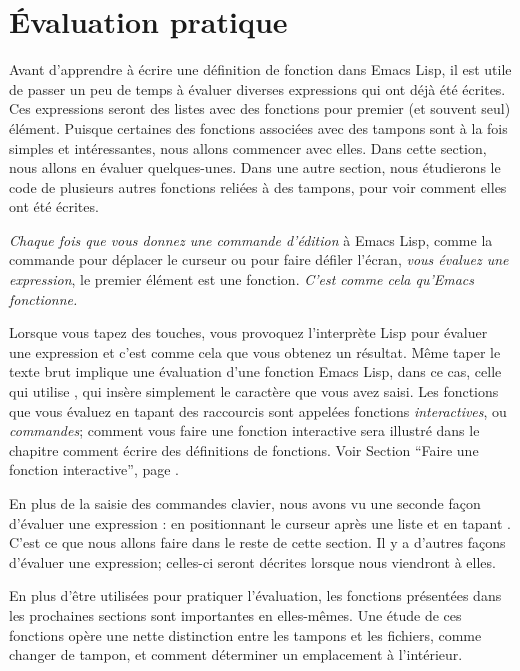 \chapter{\'Evaluation pratique}

Avant d'apprendre à écrire une définition de fonction dans Emacs Lisp,
il est utile de passer un peu de temps à évaluer diverses expressions
qui ont déjà été écrites. Ces expressions seront des listes avec des
fonctions pour premier (et souvent seul) élément. Puisque certaines des
fonctions associées avec des tampons sont à la fois simples et
intéressantes, nous allons commencer avec elles. Dans cette section,
nous allons en évaluer quelques-unes. Dans une autre section, nous
étudierons le code de plusieurs autres fonctions reliées à des
tampons, pour voir comment elles ont été écrites. 

\textit{Chaque fois que vous donnez une commande d'édition} à Emacs
Lisp, comme la commande pour déplacer le curseur ou pour faire défiler
l'écran, \textit{vous évaluez une expression}, le premier élément est
une fonction. \textit{C'est comme cela qu'Emacs fonctionne.}

Lorsque vous tapez des touches, vous provoquez l'interprète Lisp pour
évaluer une expression et c'est comme cela que vous obtenez un
résultat. Même taper le texte brut implique une évaluation d'une
fonction Emacs Lisp, dans ce cas, celle qui utilise
, qui insère simplement le caractère que vous
avez saisi. Les fonctions que vous évaluez en tapant des raccourcis
sont appelées fonctions \textit{interactives}, ou \textit{commandes};
comment vous faire une fonction interactive sera illustré dans le
chapitre comment écrire des définitions de fonctions. Voir Section
 ``Faire une fonction interactive'', page .

En plus de la saisie des commandes clavier, nous avons vu une seconde
façon d'évaluer une expression : en positionnant le curseur après une
liste et en tapant . C'est ce que nous allons faire dans
le reste de cette section. Il y a d'autres façons d'évaluer une
expression; celles-ci seront décrites lorsque nous viendront à elles.

En plus d'être utilisées pour pratiquer l'évaluation, les fonctions
présentées dans les prochaines sections sont importantes en
elles-mêmes. Une étude de ces fonctions opère une nette distinction
entre les tampons et les fichiers, comme changer de tampon, et comment
déterminer un emplacement à l'intérieur.










